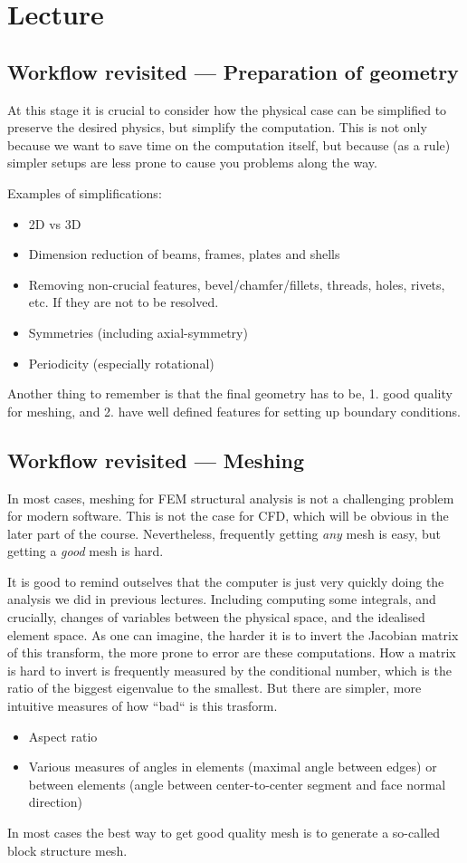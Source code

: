 \documentclass[12pt]{article}
\begin{document}
\section{Lecture}
\subsection{Workflow revisited --- Preparation of geometry}
At this stage it is crucial to consider how the physical case can be simplified to preserve the desired physics, but simplify the computation. This is not only because we want to save time on the computation itself, but because (as a rule) simpler setups are less prone to cause you problems along the way.

Examples of simplifications:
\begin{itemize}
    \item 2D vs 3D
    \item Dimension reduction of beams, frames, plates and shells
    \item Removing non-crucial features, bevel/chamfer/fillets, threads, holes, rivets, etc. If they are not to be resolved.
    \item Symmetries (including axial-symmetry)
    \item Periodicity (especially rotational)
\end{itemize}

Another thing to remember is that the final geometry has to be, 1. good quality for meshing, and 2. have well defined features for setting up boundary conditions.

\subsection{Workflow revisited --- Meshing}
In most cases, meshing for FEM structural analysis is not a challenging problem for modern software. This is not the case for CFD, which will be obvious in the later part of the course. Nevertheless, frequently getting {\it any} mesh is easy, but getting a {\it good} mesh is hard.

It is good to remind outselves that the computer is just very quickly doing the analysis we did in previous lectures. Including computing some integrals, and crucially, changes of variables between the physical space, and the idealised element space. As one can imagine, the harder it is to invert the Jacobian matrix of this transform, the more prone to error are these computations. How a matrix is hard to invert is frequently measured by the conditional number, which is the ratio of the biggest eigenvalue to the smallest. But there are simpler, more intuitive measures of how ``bad`` is this trasform.
\begin{itemize}
    \item Aspect ratio
    \item Various measures of angles in elements (maximal angle between edges) or between elements (angle between center-to-center segment and face normal direction)
\end{itemize}
In most cases the best way to get good quality mesh is to generate a so-called block structure mesh.
\end{document}
